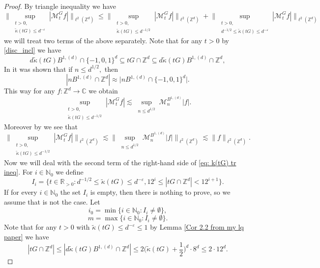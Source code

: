 \documentclass[a4paper,oneside, reqno]{amsart}
\numberwithin{equation}{section}
\theoremstyle{definition}%
\theoremstyle{definition}
\theoremstyle{definition}%
\theoremstyle{definition}
\newcommand{\Z}{\mathbb{Z}}
\newcommand{\R}{\mathbb{R}}
\newcommand{\C}{\mathbb{C}}
\newcommand{\N}{\mathbb{N}}
\begin{document}
\begin{proof}
    By triangle inequality we have 
    \begin{equation} \label{eq: k(tG) tr ineq}
        \Big\|\sup_{\substack{t>0, \\
 \widetilde{\kappa}(tG) \le d^{-\varepsilon}}} |\mathcal{M}_{t}^Gf| \Big\|_{\ell^2(\Z^d)} \le \Big\|\sup_{\substack{t>0, \\
 \widetilde{\kappa}(tG) \le d^{-1/2}}} |\mathcal{M}_{t}^Gf| \Big\|_{\ell^2(\Z^d)}+\Big\|\sup_{\substack{t>0, \\
 d^{-1/2} \le\widetilde{\kappa}(tG) \le d^{-\varepsilon}}} |\mathcal{M}_{t}^Gf| \Big\|_{\ell^2(\Z^d)}
    \end{equation}
we will treat two terms of the above separately.
Note that for any $t>0$ by \eqref{disc_incl} we have
\[
d \widetilde{\kappa}(tG) B^{1,(d)} \cap \{-1,0,1 \}^d \subseteq tG \cap \Z^d \subseteq d \widetilde{\kappa}(tG) B^{1,(d)} \cap \Z^d,
\]
In \cite[Corollary 1.8]{KNW} it was shown that if $n \le d^{1/2},$ then 
\[
|n B^{1,(d)} \cap \Z^d| \approx \Big|n B^{1,(d)} \cap \{-1,0,1 \}^d \Big|.
\]
This way for any $f:\Z^d \to \C$ we obtain 
\[
\sup_{\substack{t>0, \\
 \widetilde{\kappa}(tG) \le d^{-1/2}}} |\mathcal{M}_{t}^Gf| \lesssim \sup_{\substack{n \le d^{1/2}}} \mathcal{M}_{n}^{B^{1,(d)}}|f|.
\]
Moreover by \cite[Theorem 1.15]{KNW} we see that 
\[
\Big\|\sup_{\substack{t>0, \\
 \widetilde{\kappa}(tG) \le d^{-1/2}}} |\mathcal{M}_{t}^Gf| \Big\|_{\ell^2(\Z^d)}\lesssim \Big\|\sup_{\substack{n \le d^{1/2}}} \mathcal{M}_{n}^{B^{1,(d)}}|f| \Big\|_{\ell^2(\Z^d)} \lesssim \|f \|_{\ell^2(\Z^d)}.
\]
Now we will deal with the second term of the right-hand side of \eqref{eq: k(tG) tr ineq}. For $i \in \N_0$ we define
\[
I_i= \{ t \in \R_{>0}: d^{-1/2} \le \widetilde{\kappa}(tG) \le d^{-\varepsilon}, 12^i \le |tG \cap \Z^d| < 12^{i+1} \Big\}.   
\]
If for every $i \in \N_0$ the set $I_i$ is empty, then there is nothing to prove, so we assume that is not the case. Let 
\[
i_0= \min\{ i \in \N_0 : I_i \neq \emptyset \},
\]
\[
m= \max\{i \in \N_0: I_i \neq \emptyset\}.
\]
Note that for any $t>0$ with $\widetilde{\kappa}(tG) \le d^{-\varepsilon} \le 1$ by Lemma \ref{Cor 2.2 from my lq paper} we have 
\begin{equation} \label{eq: 12d bound}
    |tG \cap \Z^d | \le | d \widetilde{\kappa}(tG)B^{1,(d)} \cap \Z^d | \le 2\Big( \widetilde{\kappa}(tG)+ \frac{1}{2} \Big)^d \cdot 8^d \le 2 \cdot 12^d.
\end{equation}

\end{proof}
\end{document}
